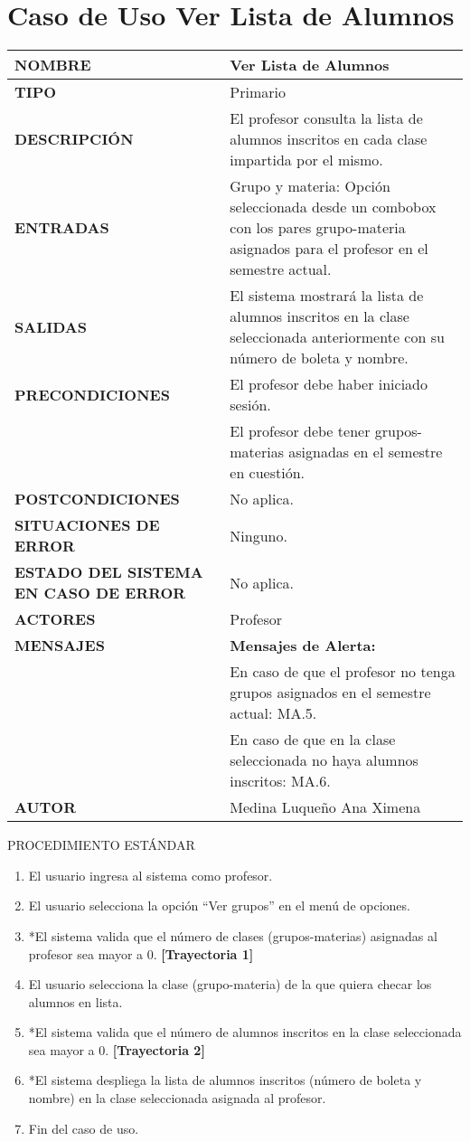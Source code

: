 \newpage
\section{Caso de Uso Ver Lista de Alumnos}
\begin{longtable}{ | p{6cm} | p{10cm} |}
\hline
\textbf{NOMBRE} & Ver Lista de Alumnos\\
\hline
\textbf{TIPO} & Primario\\
\hline
\textbf{DESCRIPCIÓN} & El profesor consulta la lista de alumnos inscritos en cada clase impartida por el mismo.\\
\hline
\textbf{ENTRADAS}  & Grupo y materia: Opción seleccionada desde un combobox con los pares grupo-materia asignados para el profesor en el semestre actual.  \\
\hline
\textbf{SALIDAS} & El sistema mostrará la lista de alumnos inscritos en la clase seleccionada anteriormente con su número de boleta y nombre.\\
\hline
\textbf{PRECONDICIONES} & El profesor debe haber iniciado sesión.
                        \\ & El profesor debe tener grupos-materias asignadas en el semestre en cuestión.\\
\hline
\textbf{POSTCONDICIONES} & No aplica.\\
\hline
\textbf{SITUACIONES DE ERROR} & Ninguno.\\
\hline
\textbf{ESTADO DEL SISTEMA EN CASO DE ERROR} & No aplica.\\
\hline
\textbf{ACTORES} & Profesor\\
\hline
\textbf{MENSAJES} & \textbf{Mensajes de Alerta:}
\\& En caso de que el profesor no tenga grupos asignados en el semestre actual: MA.5.
\\& En caso de que en la clase seleccionada no haya alumnos inscritos: MA.6.\\
\hline
\textbf{AUTOR} & Medina Luqueño Ana Ximena\\
\hline
\end{longtable}
\vspace*{1cm}
\noindent
\Large{PROCEDIMIENTO ESTÁNDAR}
\large{}
\begin{enumerate}
    \item El usuario ingresa al sistema como profesor.
    \item El usuario selecciona la opción “Ver grupos” en el menú de opciones.
    \item *El sistema valida que el número de clases (grupos-materias) asignadas al profesor sea mayor a 0. \textbf{[Trayectoria 1]}
    \item El usuario selecciona la clase (grupo-materia) de la que quiera checar los alumnos en lista.
    \item *El sistema valida que el número de alumnos inscritos en la clase seleccionada sea mayor a 0. \textbf{[Trayectoria 2]}
    \item *El sistema despliega la lista de alumnos inscritos (número de boleta y nombre) en la clase seleccionada asignada al profesor.
    \item Fin del caso de uso.
\end{enumerate}
